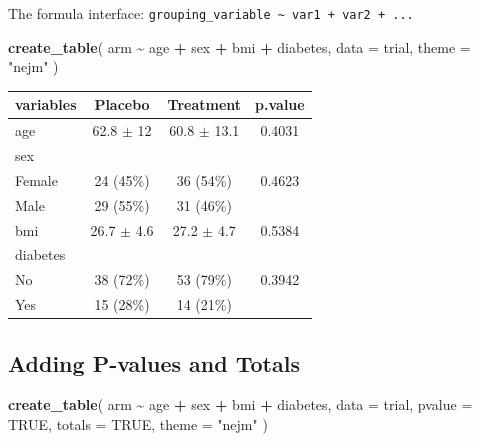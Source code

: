 \documentclass[
]{article}
\newenvironment{Shaded}{\begin{snugshade}}{\end{snugshade}}
\newcommand{\AttributeTok}[1]{\textcolor[rgb]{0.13,0.29,0.53}{#1}}
\newcommand{\ConstantTok}[1]{\textcolor[rgb]{0.56,0.35,0.01}{#1}}
\newcommand{\FunctionTok}[1]{\textcolor[rgb]{0.13,0.29,0.53}{\textbf{#1}}}
\newcommand{\NormalTok}[1]{#1}
\newcommand{\SpecialCharTok}[1]{\textcolor[rgb]{0.81,0.36,0.00}{\textbf{#1}}}
\newcommand{\StringTok}[1]{\textcolor[rgb]{0.31,0.60,0.02}{#1}}
\begin{document}
The formula interface:
\texttt{grouping\_variable\ \textasciitilde{}\ var1\ +\ var2\ +\ ...}

\begin{Shaded}
\begin{Highlighting}[]
\FunctionTok{create\_table}\NormalTok{(}
\NormalTok{  arm }\SpecialCharTok{\textasciitilde{}}\NormalTok{ age }\SpecialCharTok{+}\NormalTok{ sex }\SpecialCharTok{+}\NormalTok{ bmi }\SpecialCharTok{+}\NormalTok{ diabetes,}
  \AttributeTok{data =}\NormalTok{ trial,}
  \AttributeTok{theme =} \StringTok{"nejm"}
\NormalTok{)}
\end{Highlighting}
\end{Shaded}

\begin{tabular}{lccc}
\toprule
\definecolor{nejmstripe}{HTML}{fefcf0}
\definecolor{nejmtext}{HTML}{333333}
\definecolor{nejmstripe}{HTML}{fefcf0}
\definecolor{nejmtext}{HTML}{333333}

\textbf{variables} & \textbf{Placebo} & \textbf{Treatment} & \textbf{p.value} \\
\midrule
age & 62.8 $\pm$ 12 & 60.8 $\pm$ 13.1 & 0.4031 \\
\rowcolor{nejmstripe} sex &  &  &  \\
\hspace{1em}Female & 24 (45\%) & 36 (54\%) & 0.4623 \\
\rowcolor{nejmstripe} \hspace{1em}Male & 29 (55\%) & 31 (46\%) &  \\
bmi & 26.7 $\pm$ 4.6 & 27.2 $\pm$ 4.7 & 0.5384 \\
\rowcolor{nejmstripe} diabetes &  &  &  \\
\hspace{1em}No & 38 (72\%) & 53 (79\%) & 0.3942 \\
\rowcolor{nejmstripe} \hspace{1em}Yes & 15 (28\%) & 14 (21\%) &  \\
\bottomrule
\end{tabular}

\subsection{Adding P-values and
Totals}\label{adding-p-values-and-totals}

\begin{Shaded}
\begin{Highlighting}[]
\FunctionTok{create\_table}\NormalTok{(}
\NormalTok{  arm }\SpecialCharTok{\textasciitilde{}}\NormalTok{ age }\SpecialCharTok{+}\NormalTok{ sex }\SpecialCharTok{+}\NormalTok{ bmi }\SpecialCharTok{+}\NormalTok{ diabetes,}
  \AttributeTok{data =}\NormalTok{ trial,}
  \AttributeTok{pvalue =} \ConstantTok{TRUE}\NormalTok{,}
  \AttributeTok{totals =} \ConstantTok{TRUE}\NormalTok{,}
  \AttributeTok{theme =} \StringTok{"nejm"}
\NormalTok{)}
\end{Highlighting}
\end{Shaded}
\end{document}
